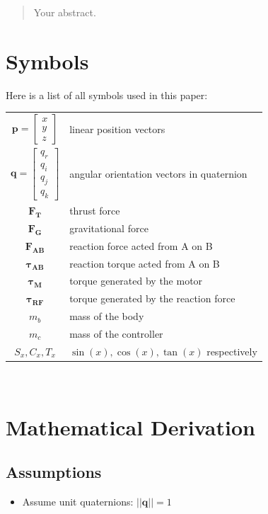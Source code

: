 \begin{abstract}
Your abstract.
\end{abstract}
\section{Symbols}
Here is a list of all symbols used in this paper:
\\
\begin{tabular}{c p{}}
  $\bm{p} = \begin{bmatrix}x \\ y \\ z \end{bmatrix}$ & linear position vectors \\
  $\bm{q} = \begin{bmatrix} q_r \\ q_i \\ q_j \\ q_k \end{bmatrix}$ & angular orientation vectors in quaternion \\
  $\bm{F_{T}}$ & thrust force \\
  $\bm{F_{G}}$ & gravitational force \\  
  $\bm{F_{AB}}$ & reaction force acted from A on B \\
  $\bm{\tau_{AB}}$ & reaction torque acted from A on B \\
  $\bm{\tau_{M}}$ & torque generated by the motor \\
  $\bm{\tau_{RF}}$ & torque generated by the reaction force \\  
  $m_b$ & mass of the body \\
  $m_c$ & mass of the controller \\
  $S_x, C_x, T_x$ & $\sin(x), \cos(x), \tan(x)$ respectively \\
\end{tabular}\\
\section{Mathematical Derivation}

\subsection{Assumptions}
\begin{itemize}
\item Assume unit quaternions: $||\bm{q}|| = 1$
\end{itemize}

